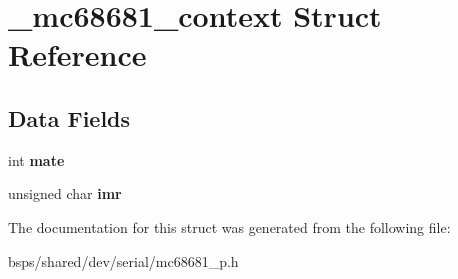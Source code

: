 \hypertarget{struct__mc68681__context}{}\section{\+\_\+mc68681\+\_\+context Struct Reference}
\label{struct__mc68681__context}
\subsection*{Data Fields}
\begin{DoxyCompactItemize}
\item 
\mbox{\label{struct__mc68681__context_a8a152831631bedafe2356a4864f951b9}} 
int {\bfseries mate}
\item 
\mbox{\label{struct__mc68681__context_a0fe15ff76cc14eb5ce5538554cf57aad}} 
unsigned char {\bfseries imr}
\end{DoxyCompactItemize}


The documentation for this struct was generated from the following file\+:\begin{DoxyCompactItemize}
\item 
bsps/shared/dev/serial/mc68681\+\_\+p.\+h\end{DoxyCompactItemize}
